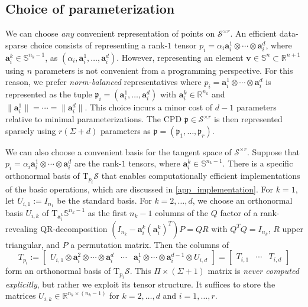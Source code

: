 \documentclass[a4paper,10pt,final]{siamart1116}
\newcommand{\tuple}[1]{\mathfrak{#1}}
\newcommand{\Var}[1]{\mathcal{#1}}
\newcommand{\vect}[1]{\mathbf{#1}}
\newcommand{\sten}[3]{\vect{#1}_{#2}^{#3}}
\newcommand{\Tang}[2]{\mathrm{T}_{#1} {#2}}
\newcommand{\R}{\mathbb{R}}
\newcommand{\refapp}[1]{{\cref{#1}}}
\numberwithin{equation}{section}
\numberwithin{figure}{section}
\numberwithin{table}{section}
\numberwithin{theorem}{section}
\begin{document}
\subsection{Choice of parameterization}\label{sec_parametrization}
We can choose \emph{any} convenient representation of points on $\Var{S}^{\times r}$.
An efficient data-sparse choice consists of representing a rank-$1$ tensor $p_i = \alpha_i \sten{a}{i}{1} \otimes \cdots \otimes \sten{a}{i}{d}$, where $\sten{a}{i}{k} \in \mathbb{S}^{n_k-1}$, as $(\alpha_i, \sten{a}{i}{1}, \ldots, \sten{a}{i}{d})$. However, representing an element $\vect{v} \in \mathbb{S}^{n} \subset \R^{n+1}$ using $n$ parameters is not convenient from a programming perspective.
For this reason, we prefer \emph{norm-balanced} representatives where $p_i = \sten{a}{i}{1} \otimes \cdots \otimes \sten{a}{i}{d}$ is represented as the tuple $\tuple{p}_i = (\sten{a}{i}{1},\ldots,\sten{a}{i}{d})$ with $\sten{a}{i}{k} \in \R^{n_k}$ and $\|\sten{a}{i}{1}\| = \cdots = \|\sten{a}{i}{d}\|$. This choice incurs a minor cost of $d-1$ parameters relative to minimal parameterizations. The CPD $\tuple{p} \in \Var{S}^{\times r}$ is then represented sparsely using $r(\Sigma+d)$ parameters as $\tuple{p} = (\tuple{p}_1, \ldots, \tuple{p}_r)$.

We can also choose a convenient basis for the tangent space of $\Var{S}^{\times r}$. Suppose that $p_i = \alpha_i \sten{a}{i}{1} \otimes \cdots \otimes \sten{a}{i}{d}$ are the rank-$1$ tensors, where $\sten{a}{i}{k} \in \mathbb{S}^{n_k-1}$. There is a specific orthonormal basis of $\Tang{p_i}{\Var{S}}$ that enables computationally efficient implementations of the basic operations, which are discussed in \refapp{app_implementation}. For $k=1$, let $U_{i,1} := I_{n_1}$ be the standard basis. For $k=2,\dots,d$, we choose an orthonormal basis $U_{i,k}$ of $\Tang{\sten{a}{i}{k}}{\mathbb{S}^{n_k-1}}$ as the first $n_k-1$ columns of the $Q$ factor of a rank-revealing QR-decomposition \((I_{n_k} - \sten{a}{i}{k} (\sten{a}{i}{k})^T)P = QR\) with $Q^T Q = I_{n_k}$, $R$ upper triangular, and $P$ a permutation matrix. Then the columns of
\begin{equation} \label{eqn_def_tangent_segre_repr}
 T_{p_i}
 :=
 \begin{bmatrix} U_{i,1}\otimes\sten{a}{i}{2}\otimes\cdots\otimes\sten{a}{i}{d} & \cdots & \sten{a}{i}{1}\otimes\cdots\otimes\sten{a}{i}{d-1}\otimes U_{i,d} \end{bmatrix}
 = \begin{bmatrix} T_{i,1} & \cdots & T_{i,d} \end{bmatrix}
\end{equation}
form an orthonormal basis of $\Tang{p_i}{\Var{S}}$. This $\Pi \times (\Sigma+1)$ matrix is \emph{never computed explicitly}, but rather we exploit its tensor structure. It suffices to store the matrices $U_{i,k} \in \R^{n_k \times (n_k-1)}$ for $k=2,\ldots,d$ and $i=1,\ldots,r$.
\end{document}
